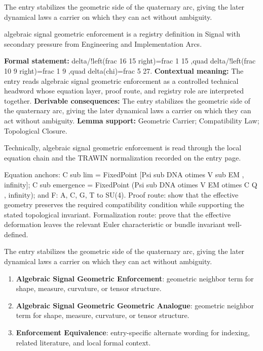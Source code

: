 The entry stabilizes the geometric side of the quaternary arc, giving the later dynamical laws a carrier on which they can act without ambiguity.
\clearpage


\begingroup\small
{}
algebraic signal geometric enforcement is a registry definition in Signal with secondary pressure from Engineering and Implementation Arcs.

\begingroup\footnotesize\setlength{\emergencystretch}{3em}\sloppy
\textbf{Formal statement:} delta/!left(frac 16 15 right)=frac 1 15 ,quad delta/!left(frac 10 9 right)=frac 1 9 ,quad delta(chi)=frac 5 27. \textbf{Contextual meaning:} The entry reads algebraic signal geometric enforcement as a controlled technical headword whose equation layer, proof route, and registry role are interpreted together. \textbf{Derivable consequences:} The entry stabilizes the geometric side of the quaternary arc, giving the later dynamical laws a carrier on which they can act without ambiguity. \textbf{Lemma support:} Geometric Carrier; Compatibility Law; Topological Closure.\par
\endgroup

Technically, algebraic signal geometric enforcement is read through the local equation chain and the TRAWIN normalization recorded on the entry page.

Equation anchors: C sub lim = FixedPoint [Psi sub DNA otimes V sub EM , infinity]; C sub emergence = FixedPoint (Psi sub DNA otimes V EM otimes C Q , infinity); and F: A, C, G, T to SU(4). Proof route: show that the effective geometry preserves the required compatibility condition while supporting the stated topological invariant. Formalization route: prove that the effective deformation leaves the relevant Euler characteristic or bundle invariant well-defined.

The entry stabilizes the geometric side of the quaternary arc, giving the later dynamical laws a carrier on which they can act without ambiguity.
\endgroup

\begin{enumerate}[leftmargin=1.6em,itemsep=6pt,topsep=4pt]
\item \textbf{Algebraic Signal Geometric Enforcement}: geometric neighbor term for shape, measure, curvature, or tensor structure.
\item \textbf{Algebraic Signal Geometric Geometric Analogue}: geometric neighbor term for shape, measure, curvature, or tensor structure.
\item \textbf{Enforcement Equivalence}: entry-specific alternate wording for indexing, related literature, and local formal context.
\end{enumerate}

